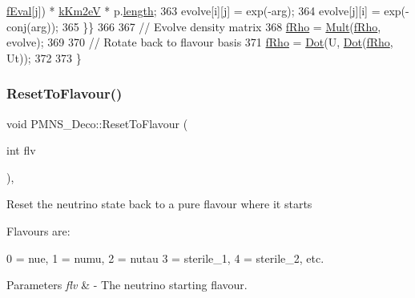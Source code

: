 \begin{DoxyCode}
      \hyperlink{classOscProb_1_1PMNS__Base_a6319c34d7decbb9d7d6da279c06e8c2d}{fEval}[j]) * \hyperlink{classOscProb_1_1PMNS__Base_a382ddd7b76ca89b43f22614a2ea7327b}{kKm2eV} * p.\hyperlink{structOscProb_1_1NuPath_af22660894b6e25cf835500381b155557}{length};
363     evolve[i][j] = exp(-arg);
364     evolve[j][i] = exp(-conj(arg));
365   \}\}
366   
367   \textcolor{comment}{// Evolve density matrix}
368   \hyperlink{classOscProb_1_1PMNS__Deco_a0488d62b4ef4cf5b43425769f5fcdbdf}{fRho} = \hyperlink{classOscProb_1_1PMNS__Deco_aacc9909556ca22aca30620893e12b0db}{Mult}(\hyperlink{classOscProb_1_1PMNS__Deco_a0488d62b4ef4cf5b43425769f5fcdbdf}{fRho}, evolve);
369   
370   \textcolor{comment}{// Rotate back to flavour basis}
371   \hyperlink{classOscProb_1_1PMNS__Deco_a0488d62b4ef4cf5b43425769f5fcdbdf}{fRho} = \hyperlink{classOscProb_1_1PMNS__Deco_a8d6b547de294c0d52d4208bde44fe171}{Dot}(U, \hyperlink{classOscProb_1_1PMNS__Deco_a8d6b547de294c0d52d4208bde44fe171}{Dot}(\hyperlink{classOscProb_1_1PMNS__Deco_a0488d62b4ef4cf5b43425769f5fcdbdf}{fRho}, Ut));
372 
373 \}
\end{DoxyCode}
\mbox{\label{classOscProb_1_1PMNS__Deco_a393940f176614e3ffebeea40cfe78a62}} 
\subsubsection{\texorpdfstring{Reset\+To\+Flavour()}{ResetToFlavour()}}
{\footnotesize\ttfamily void P\+M\+N\+S\+\_\+\+Deco\+::\+Reset\+To\+Flavour (\begin{DoxyParamCaption}\item[{int}]{flv }\end{DoxyParamCaption})\hspace{0.3cm}{\ttfamily [protected]}, {\ttfamily [virtual]}}

Reset the neutrino state back to a pure flavour where it starts

Flavours are\+: 
\begin{DoxyPre}
  0 = nue, 1 = numu, 2 = nutau
  3 = sterile\_1, 4 = sterile\_2, etc.
\end{DoxyPre}
 
\begin{DoxyParams}{Parameters}
{\em flv} & -\/ The neutrino starting flavour. \\
\hline
\end{DoxyParams}


